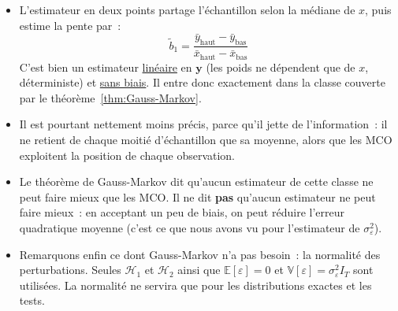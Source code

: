 \documentclass[10pt]{beamer}
\begin{document}
\begin{notes}

  \begin{itemize}

  \item L'estimateur \guillemotleft en deux points \guillemotright{} partage
    l'échantillon selon la médiane de $x$, puis estime la pente par~:
    \[
      \tilde b_1 = \frac{\bar y_{\text{haut}} - \bar y_{\text{bas}}}
                        {\bar x_{\text{haut}} - \bar x_{\text{bas}}}
    \]
    C'est bien un estimateur \underline{linéaire} en $\mathbf y$ (les poids ne dépendent
    que de $x$, déterministe) et \underline{sans biais}. Il entre donc exactement dans
    la classe couverte par le théorème~\ref{thm:Gauss-Markov}.\newline

  \item Il est pourtant nettement moins précis, parce qu'il jette de l'information~:
    il ne retient de chaque moitié d'échantillon que sa moyenne, alors que les MCO
    exploitent la position de chaque observation.\newline

  \item Le théorème de Gauss-Markov dit qu'aucun estimateur de cette classe ne peut
    faire mieux que les MCO. Il ne dit \textbf{pas} qu'aucun estimateur ne peut faire
    mieux~: en acceptant un peu de biais, on peut réduire l'erreur quadratique moyenne
    (c'est ce que nous avons vu pour l'estimateur de $\sigma_{\varepsilon}^2$).\newline

  \item Remarquons enfin ce dont Gauss-Markov n'a pas besoin~: la normalité des
    perturbations. Seules $\mathcal H_1$ et $\mathcal H_2$ ainsi que
    $\mathbb E[\varepsilon]=0$ et $\mathbb V[\varepsilon]=\sigma_{\varepsilon}^2 I_T$
    sont utilisées. La normalité ne servira que pour les distributions exactes et les
    tests.

  \end{itemize}

\end{notes}
\end{document}
